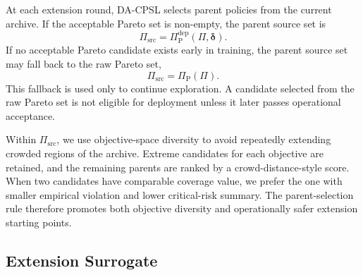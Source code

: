 \documentclass[sigconf,review,anonymous]{acmart}
\begin{document}
At each extension round, DA-CPSL selects parent policies from the current
archive. If the acceptable Pareto set is non-empty, the parent source set
is
\begin{equation}
 \Pi_{\mathrm{src}}
 =
 \Pi_{\mathrm{P}}^{\mathrm{dep}}(\Pi,\boldsymbol{\delta}).
 \label{eq:app-parent-source-acceptable}
\end{equation}
If no acceptable Pareto candidate exists early in training, the parent
source set may fall back to the raw Pareto set,
\begin{equation}
 \Pi_{\mathrm{src}}
 =
 \Pi_{\mathrm{P}}(\Pi).
 \label{eq:app-parent-source-raw}
\end{equation}
This fallback is used only to continue exploration. A candidate selected
from the raw Pareto set is not eligible for deployment unless it later
passes operational acceptance.

Within \(\Pi_{\mathrm{src}}\), we use objective-space diversity to avoid
repeatedly extending crowded regions of the archive. Extreme candidates
for each objective are retained, and the remaining parents are ranked by
a crowd-distance-style score. When two candidates have comparable
coverage value, we prefer the one with smaller empirical violation and
lower critical-risk summary. The parent-selection rule therefore promotes
both objective diversity and operationally safer extension starting
points.

\subsection{Extension Surrogate}
\label{app:extension-surrogate}
\end{document}

